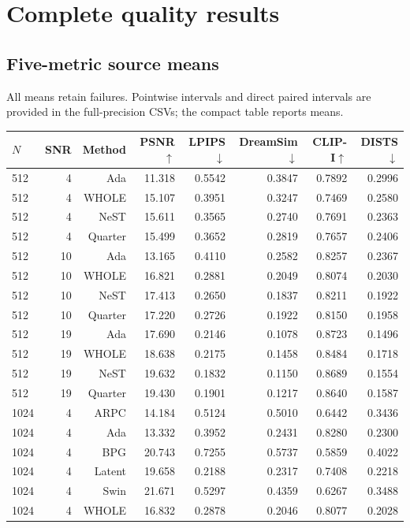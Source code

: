 \documentclass[10pt,letterpaper]{article}
\begin{document}
\section{Complete quality results}
\subsection{Five-metric source means}
All means retain failures. Pointwise intervals and direct paired intervals are provided in the full-precision CSVs; the compact table reports means.

\begin{longtable}{@{}lrrrrrrr@{}}\toprule
$N$ & SNR & Method & PSNR$\uparrow$ & LPIPS$\downarrow$ & DreamSim$\downarrow$ & CLIP-I$\uparrow$ & DISTS$\downarrow$\\\midrule\endhead
512 & 4 & Ada & 11.318 & 0.5542 & 0.3847 & 0.7892 & 0.2996\\
512 & 4 & WHOLE & 15.107 & 0.3951 & 0.3247 & 0.7469 & 0.2580\\
512 & 4 & NeST & 15.611 & 0.3565 & 0.2740 & 0.7691 & 0.2363\\
512 & 4 & Quarter & 15.499 & 0.3652 & 0.2819 & 0.7657 & 0.2406\\
512 & 10 & Ada & 13.165 & 0.4110 & 0.2582 & 0.8257 & 0.2367\\
512 & 10 & WHOLE & 16.821 & 0.2881 & 0.2049 & 0.8074 & 0.2030\\
512 & 10 & NeST & 17.413 & 0.2650 & 0.1837 & 0.8211 & 0.1922\\
512 & 10 & Quarter & 17.220 & 0.2726 & 0.1922 & 0.8150 & 0.1958\\
512 & 19 & Ada & 17.690 & 0.2146 & 0.1078 & 0.8723 & 0.1496\\
512 & 19 & WHOLE & 18.638 & 0.2175 & 0.1458 & 0.8484 & 0.1718\\
512 & 19 & NeST & 19.632 & 0.1832 & 0.1150 & 0.8689 & 0.1554\\
512 & 19 & Quarter & 19.430 & 0.1901 & 0.1217 & 0.8640 & 0.1587\\
1024 & 4 & ARPC & 14.184 & 0.5124 & 0.5010 & 0.6442 & 0.3436\\
1024 & 4 & Ada & 13.332 & 0.3952 & 0.2431 & 0.8280 & 0.2300\\
1024 & 4 & BPG & 20.743 & 0.7255 & 0.5737 & 0.5859 & 0.4022\\
1024 & 4 & Latent & 19.658 & 0.2188 & 0.2317 & 0.7408 & 0.2218\\
1024 & 4 & Swin & 21.671 & 0.5297 & 0.4359 & 0.6267 & 0.3488\\
1024 & 4 & WHOLE & 16.832 & 0.2878 & 0.2046 & 0.8077 & 0.2028\\

\end{longtable}
\end{document}
